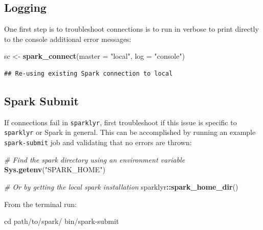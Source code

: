 \documentclass[]{book}
\newenvironment{Shaded}{\begin{snugshade}}{\end{snugshade}}
\newcommand{\BuiltInTok}[1]{#1}
\newcommand{\CommentTok}[1]{\textcolor[rgb]{0.56,0.35,0.01}{\textit{#1}}}
\newcommand{\DataTypeTok}[1]{\textcolor[rgb]{0.13,0.29,0.53}{#1}}
\newcommand{\ExtensionTok}[1]{#1}
\newcommand{\KeywordTok}[1]{\textcolor[rgb]{0.13,0.29,0.53}{\textbf{#1}}}
\newcommand{\NormalTok}[1]{#1}
\newcommand{\OperatorTok}[1]{\textcolor[rgb]{0.81,0.36,0.00}{\textbf{#1}}}
\newcommand{\StringTok}[1]{\textcolor[rgb]{0.31,0.60,0.02}{#1}}
\theoremstyle{definition}
\theoremstyle{definition}
\theoremstyle{definition}
\theoremstyle{remark}
\begin{document}
\hypertarget{logging}{%
\subsection{Logging}\label{logging}}

One first step is to troubleshoot connections is to run in verbose to
print directly to the console additional error messages:

\begin{Shaded}
\begin{Highlighting}[]
\NormalTok{sc <-}\StringTok{ }\KeywordTok{spark_connect}\NormalTok{(}\DataTypeTok{master =} \StringTok{"local"}\NormalTok{, }\DataTypeTok{log =} \StringTok{"console"}\NormalTok{)}
\end{Highlighting}
\end{Shaded}

\begin{verbatim}
## Re-using existing Spark connection to local
\end{verbatim}

\hypertarget{troubleshoot-spark-submit}{%
\subsection{Spark Submit}\label{troubleshoot-spark-submit}}

If connections fail in \texttt{sparklyr}, first troubleshoot if this
issue is specific to \texttt{sparklyr} or Spark in general. This can be
accomplished by running an example \texttt{spark-submit} job and
validating that no errors are thrown:

\begin{Shaded}
\begin{Highlighting}[]
\CommentTok{# Find the spark directory using an environment variable}
\KeywordTok{Sys.getenv}\NormalTok{(}\StringTok{"SPARK_HOME"}\NormalTok{)}

\CommentTok{# Or by getting the local spark installation}
\NormalTok{sparklyr}\OperatorTok{::}\KeywordTok{spark_home_dir}\NormalTok{()}
\end{Highlighting}
\end{Shaded}

From the terminal run:

\begin{Shaded}
\begin{Highlighting}[]
\BuiltInTok{cd}\NormalTok{ path/to/spark/}
\ExtensionTok{bin/spark-submit} 
\end{Highlighting}
\end{Shaded}
\end{document}
